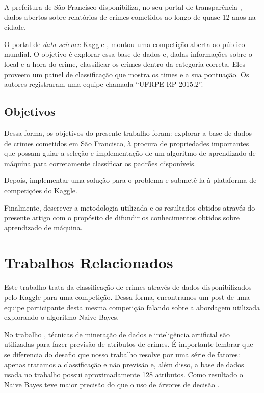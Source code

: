 \documentclass[conference]{IEEEtran}
\begin{document}
A prefeitura de São Francisco disponibiliza, no seu portal de transparência 
\cite{sf_open_data}, dados abertos sobre relatórios de crimes cometidos ao longo 
de quase 12 anos na cidade.

O portal de \textit{data science} Kaggle \cite{kaggle}, montou uma competição 
aberta ao público mundial. O objetivo é explorar essa base de dados e, dadas 
informações sobre o local e a hora do crime, classificar os crimes dentro da 
categoria correta. Eles proveem um painel de classificação que mostra os times e 
a sua pontuação. Os autores registraram uma equipe chamada  “UFRPE-RP-2015.2”.

\subsection{Objetivos}

Dessa forma, os objetivos do presente trabalho foram: explorar a base de dados 
de crimes cometidos em São Francisco, à procura de propriedades importantes que 
possam guiar a seleção e implementação de um algoritmo de aprendizado de máquina 
para corretamente classificar os padrões disponíveis.

Depois, implementar uma solução para o problema e submetê-la à plataforma de 
competições do Kaggle.

Finalmente, descrever a metodologia utilizada e os resultados obtidos através do 
presente artigo com o propósito de difundir os conhecimentos obtidos sobre 
aprendizado de máquina.

\section{Trabalhos Relacionados}
Este trabalho trata da classificação de crimes através de dados disponibilizados 
pelo Kaggle \cite{kaggle} para uma competição. Dessa forma, encontramos um post 
\cite{efavdb} de uma equipe participante desta mesma competição falando sobre a 
abordagem utilizada explorando o algoritmo Naive Bayes.

No trabalho \cite{Saeed2015}, técnicas de mineração de dados e inteligência 
artificial são utilizadas para fazer previsão de atributos de crimes. É 
importante lembrar que \cite{Saeed2015} se diferencia do desafio que nosso 
trabalho resolve por uma série de fatores: apenas tratamos a classificação e não 
previsão e, além disso, a base de dados usada no trabalho  \cite{Saeed2015} 
possui aproximadamente 128 atributos. Como resultado o Naive Bayes 
\cite{naivebayes} teve maior precisão do que o uso de árvores de decisão 
\cite{decisiontree}.
\end{document}
